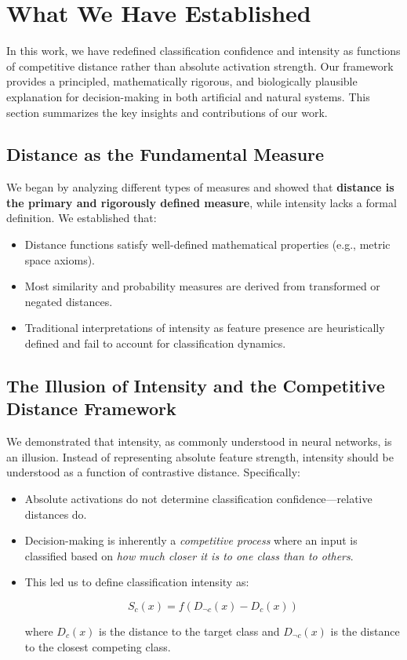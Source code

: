 \section{What We Have Established}

In this work, we have redefined classification confidence and intensity as functions of competitive distance rather than absolute activation strength. Our framework provides a principled, mathematically rigorous, and biologically plausible explanation for decision-making in both artificial and natural systems. This section summarizes the key insights and contributions of our work.

\subsection{Distance as the Fundamental Measure}

We began by analyzing different types of measures and showed that \textbf{distance is the primary and rigorously defined measure}, while intensity lacks a formal definition. We established that:

\begin{itemize}
    \item Distance functions satisfy well-defined mathematical properties (e.g., metric space axioms).
    \item Most similarity and probability measures are derived from transformed or negated distances.
    \item Traditional interpretations of intensity as feature presence are heuristically defined and fail to account for classification dynamics.
\end{itemize}

\subsection{The Illusion of Intensity and the Competitive Distance Framework}

We demonstrated that intensity, as commonly understood in neural networks, is an illusion. Instead of representing absolute feature strength, intensity should be understood as a function of contrastive distance. Specifically:

\begin{itemize}
    \item Absolute activations do not determine classification confidence—relative distances do.
    \item Decision-making is inherently a \textit{competitive process} where an input is classified based on \textit{how much closer it is to one class than to others}.
    \item This led us to define classification intensity as:
    
    \[
    S_c(x) = f(D_{\neg c}(x) - D_c(x))
    \]

    where \( D_c(x) \) is the distance to the target class and \( D_{\neg c}(x) \) is the distance to the closest competing class.
\end{itemize}

